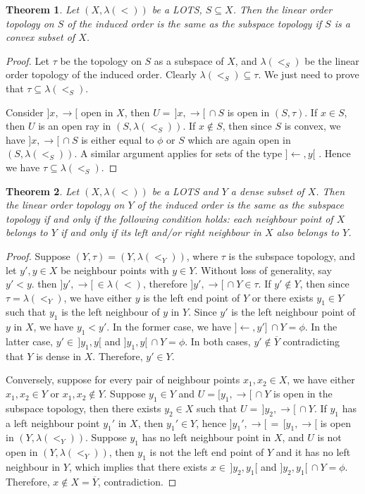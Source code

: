 \documentclass[12pt,oneside,english]{amsbook}
\numberwithin{equation}{section} %
\numberwithin{figure}{section} %
\theoremstyle{plain}
\numberwithin{section}{chapter}
\newtheorem{thm}{Theorem}[section]
\theoremstyle{plain}
\begin{document}
\begin{thm}
  Let $(X,\lambda (<))$ be a LOTS, $S \subseteq X$. Then the linear order topology on $S$ of the induced order is the same as the subspace topology if $S$ is a convex subset of $X$.
\end{thm}
\begin{proof}
  Let $\tau$ be the topology on $S$ as a subspace of $X$, and $\lambda (<_{S})$ be the linear order topology of the induced order. Clearly $\lambda (<_{S}) \subseteq \tau$. We just need to prove that $\tau \subseteq \lambda (<_{S})$.

 Consider $]x, \rightarrow[$ open in $X$, then $U = \, ]x, \rightarrow[ \, \cap S$ is open in $(S, \tau)$. If $x \in S$, then $U$ is an open ray in $(S, \lambda (<_{S}))$. If $x \notin S$, then since $S$ is convex, we have $]x, \rightarrow[ \, \cap S$ is either equal to $\phi$ or $S$ which are again open in $(S, \lambda (<_{S}))$. A similar argument applies for sets of the type $]\leftarrow, y[$ . Hence we have $\tau \subseteq \lambda (<_{S})$.
\end{proof}

\begin{thm}
  Let $(X,\lambda (<))$ be a LOTS and $Y$ a dense subset of $X$. Then the linear order topology on $Y$ of the induced order is the same as the subspace topology if and only if the following condition holds: each neighbour point of $X$ belongs to $Y$ if and only if its left and/or right neighbour in $X$ also belongs to $Y$.
\end{thm}
\begin{proof}
  Suppose $(Y,\tau) = (Y, \lambda (<_{Y}))$, where $\tau$ is the subspace topology, and let $y',y \in X$ be neighbour points with $y \in Y$. Without loss of generality, say $y' < y$. then $]y',\rightarrow[ \, \in \lambda (<)$, therefore $]y',\rightarrow[ \, \cap Y \in \tau$. If $y' \notin Y$, then since $\tau = \lambda (<_{Y})$, we have either $y$ is the left end point of $Y$ or there exists $y_1 \in Y$ such that $y_1$ is the left neighbour of $y$ in $Y$. Since $y'$ is the left neighbour point of $y$ in $X$, we have $y_1 < y'$.  In the former case, we have $]\leftarrow, y'] \, \cap Y = \phi$. In the latter case, $y' \in \, ]y_1,y[$ and $]y_1,y[ \, \cap Y = \phi$. In both cases, $y' \notin \overline{Y}$ contradicting that $Y$ is dense in $X$. Therefore, $y' \in Y$.

  Conversely, suppose for every pair of neighbour points $x_1,x_2 \in X$, we have either $x_1,x_2 \in Y$ or $x_1,x_2 \notin Y$. Suppose $y_1 \in Y$ and $U = [y_1, \rightarrow[ \, \cap Y$ is open in the subspace topology, then there exists $y_2 \in X$ such that $U = \, ]y_2, \rightarrow[ \, \cap Y$. If $y_1$ has a left neighbour point $y_1'$ in $X$, then $y_1' \in Y$, hence $]y_1', \rightarrow[ \, = \, [y_1,\rightarrow[$ is open in $(Y,\lambda (<_{Y}))$. Suppose $y_1$ has no left neighbour point in $X$, and $U$ is not open in $(Y, \lambda (<_{Y}))$, then $y_1$ is not the left end point of $Y$ and it has no left neighbour in $Y$, which implies that there exists $x \in \, ]y_2, y_1[$ and $]y_2,y_1[ \, \cap Y = \phi$. Therefore, $x \notin X = \overline{Y}$, contradiction.   
\end{proof}
\end{document}
